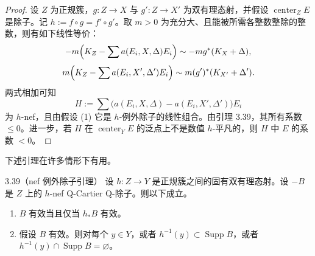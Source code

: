 \begin{proof}
设 $Z$ 为正规簇，$g:Z\to X$ 与 $g':Z\to X'$ 为双有理态射，并假设 $\operatorname{center}_Z E$ 是除子。记 $h:=f\circ g=f'\circ g'$。取 $m>0$ 为充分大、且能被所需各整数整除的整数，则有如下线性等价：
\[
-m\Bigl(K_Z-\sum a(E_i,X,\Delta)E_i\Bigr)\sim -mg^*(K_X+\Delta),
\]
\[
m\Bigl(K_Z-\sum a(E_i,X',\Delta')E_i\Bigr)\sim m(g')^*(K_{X'}+\Delta').
\]
两式相加可知
\[
H:=\sum\bigl(a(E_i,X,\Delta)-a(E_i,X',\Delta')\bigr)E_i
\]
为 $h$-nef，且由假设 (1) 它是 $h$-例外除子的线性组合。由引理 3.39，其所有系数 $\le0$。进一步，若 $H$ 在 $\operatorname{center}_Y E$ 的泛点上不是数值 $h$-平凡的，则 $H$ 中 $E$ 的系数 $<0$。
\end{proof}

下述引理在许多情形下有用。

\begin{lemmap}{3.39}（nef 例外除子引理）
设 $h:Z\to Y$ 是正规簇之间的固有双有理态射。设 $-B$ 是 $Z$ 上的 $h$-nef Q-Cartier Q-除子。则以下成立。
\begin{enumerate}[label=(\arabic*)]
\item $B$ 有效当且仅当 $h_*B$ 有效。
\item 假设 $B$ 有效。则对每个 $y\in Y$，或者 $h^{-1}(y)\subset\operatorname{Supp}B$，或者 $h^{-1}(y)\cap\operatorname{Supp}B=\varnothing$。
\end{enumerate}
\end{lemmap}


